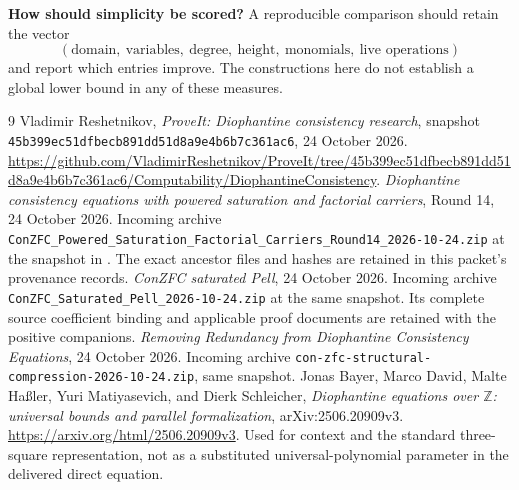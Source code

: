 \documentclass[11pt]{article}
\newcommand{\Z}{\mathbb Z}\newcommand{\N}{\mathbb N}
\newcommand{\file}[1]{\nolinkurl{#1}}
\theoremstyle{definition}\newtheorem{definition}[theorem]{Definition}
\theoremstyle{remark}\newtheorem{remark}[theorem]{Remark}
\begin{document}
\textbf{How should simplicity be scored?}
A reproducible comparison should retain the vector
\[
 (\text{domain},\ \text{variables},\ \text{degree},\
   \text{height},\ \text{monomials},\ \text{live operations})
\]
and report which entries improve. The constructions here do not establish a
global lower bound in any of these measures.

\begin{thebibliography}{9}
 Vladimir Reshetnikov, \emph{ProveIt: Diophantine consistency
research}, snapshot
\file{45b399ec51dfbecb891dd51d8a9e4b6b7c361ac6}, 24 October 2026.
\url{https://github.com/VladimirReshetnikov/ProveIt/tree/45b399ec51dfbecb891dd51d8a9e4b6b7c361ac6/Computability/DiophantineConsistency}.
\bibitem{round14} \emph{Diophantine consistency equations with powered
saturation and factorial carriers}, Round 14, 24 October 2026. Incoming
archive \file{ConZFC_Powered_Saturation_Factorial_Carriers_Round14_2026-10-24.zip}
at the snapshot in \cite{repo}. The exact ancestor files and hashes are
retained in this packet's provenance records.
 \emph{ConZFC saturated Pell}, 24 October 2026. Incoming
archive \file{ConZFC_Saturated_Pell_2026-10-24.zip} at the same snapshot.
Its complete source coefficient binding and applicable proof documents are
retained with the positive companions.
 \emph{Removing Redundancy from Diophantine Consistency
Equations}, 24 October 2026. Incoming archive
\file{con-zfc-structural-compression-2026-10-24.zip}, same snapshot.
\bibitem{bayer} Jonas Bayer, Marco David, Malte Ha\ss ler, Yuri Matiyasevich,
and Dierk Schleicher, \emph{Diophantine equations over $\Z$: universal bounds
and parallel formalization}, arXiv:2506.20909v3.
\url{https://arxiv.org/html/2506.20909v3}. Used for context and the standard
three-square representation, not as a substituted universal-polynomial
parameter in the delivered direct equation.
\end{thebibliography}

\clearpage
\appendix

\end{document}
